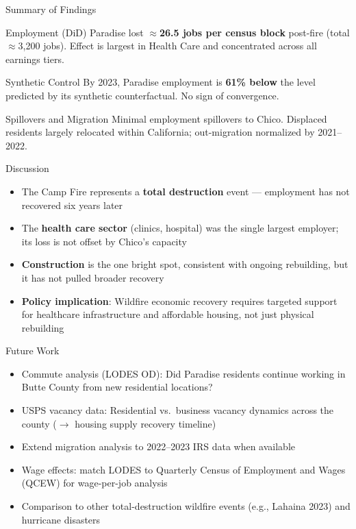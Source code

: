 \documentclass[aspectratio=169, 12pt]{beamer}
\begin{document}
\begin{frame}[shrink=5]{Summary of Findings}
  \begin{block}{Employment (DiD)}
    Paradise lost $\approx$\textbf{26.5 jobs per census block} post-fire
    (total $\approx$3,200 jobs). Effect is largest in Health Care and
    concentrated across all earnings tiers.
  \end{block}
  \begin{block}{Synthetic Control}
    By 2023, Paradise employment is \textbf{61\% below} the level predicted
    by its synthetic counterfactual. No sign of convergence.
  \end{block}
  \begin{block}{Spillovers and Migration}
    Minimal employment spillovers to Chico. Displaced residents largely
    relocated within California; out-migration normalized by 2021--2022.
  \end{block}
\end{frame}

\begin{frame}{Discussion}
  \begin{itemize}
    \item The Camp Fire represents a \textbf{total destruction} event ---
          employment has not recovered six years later
    \item The \textbf{health care sector} (clinics, hospital) was the single
          largest employer; its loss is not offset by Chico's capacity
    \item \textbf{Construction} is the one bright spot, consistent with
          ongoing rebuilding, but it has not pulled broader recovery
    \item \textbf{Policy implication}: Wildfire economic recovery requires
          targeted support for healthcare infrastructure and
          affordable housing, not just physical rebuilding
  \end{itemize}
\end{frame}

\begin{frame}{Future Work}
  \begin{itemize}
    \item Commute analysis (LODES OD): Did Paradise residents continue
          working in Butte County from new residential locations?
    \item USPS vacancy data: Residential vs.\ business vacancy dynamics
          across the county ($\to$ housing supply recovery timeline)
    \item Extend migration analysis to 2022--2023 IRS data when available
    \item Wage effects: match LODES to Quarterly Census of Employment
          and Wages (QCEW) for wage-per-job analysis
    \item Comparison to other total-destruction wildfire events
          (e.g., Lahaina 2023) and hurricane disasters
  \end{itemize}
\end{frame}
\end{document}
